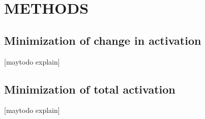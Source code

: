 \section{METHODS}
\subsection{Minimization of change in activation} %
\label{sub:minimization_of_change_in_activation}
[maytodo explain]
\subsection{Minimization of total activation} %
\label{sub:minimization_of_total_activation}
[maytodo explain]
